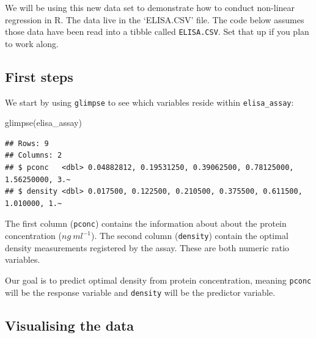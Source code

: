 \documentclass[
]{book}
\newenvironment{Shaded}{\begin{snugshade}}{\end{snugshade}}
\newcommand{\FunctionTok}[1]{\textcolor[rgb]{0.00,0.00,0.00}{#1}}
\newcommand{\NormalTok}[1]{#1}
\newenvironment{greybox}{
  \definecolor{shadecolor}{rgb}{0.95,0.95,0.95}  %
  \color{black}
  \begin{shaded}}
 {\end{shaded}}
\newenvironment{infobox}[1]
  {
  \begin{itemize}
  \renewcommand{\labelitemi}{
    \raisebox{-.7\height}[0pt][0pt]{
      {\setkeys{Gin}{width=3em,keepaspectratio}
        \texttt{[image: images/\#1]}}
    }
  }
  \setlength{\fboxsep}{1em}
  \begin{greybox}
  \item
  }
  {
  \end{greybox}
  \end{itemize}
  }
\begin{document}
\begin{infobox}{action}

\hypertarget{section-16}{%
\subsubsection*{}\label{section-16}}

We will be using this new data set to demonstrate how to conduct non-linear regression in R. The data live in the `ELISA.CSV' file. The code below assumes those data have been read into a tibble called \texttt{ELISA.CSV}. Set that up if you plan to work along.

\end{infobox}

\hypertarget{first-steps-2}{%
\subsection{First steps}\label{first-steps-2}}

We start by using \texttt{glimpse} to see which variables reside within \texttt{elisa\_assay}:

\begin{Shaded}
\begin{Highlighting}[]
\FunctionTok{glimpse}\NormalTok{(elisa\_assay)}
\end{Highlighting}
\end{Shaded}

\begin{verbatim}
## Rows: 9
## Columns: 2
## $ pconc   <dbl> 0.04882812, 0.19531250, 0.39062500, 0.78125000, 1.56250000, 3.~
## $ density <dbl> 0.017500, 0.122500, 0.210500, 0.375500, 0.611500, 1.010000, 1.~
\end{verbatim}

The first column (\texttt{pconc}) contains the information about about the protein concentration (\(ng\ ml^{-1}\)). The second column (\texttt{density}) contain the optimal density measurements registered by the assay. These are both numeric ratio variables.

Our goal is to predict optimal density from protein concentration, meaning \texttt{pconc} will be the response variable and \texttt{density} will be the predictor variable.

\hypertarget{visualising-the-data-2}{%
\subsection{Visualising the data}\label{visualising-the-data-2}}
\end{document}
